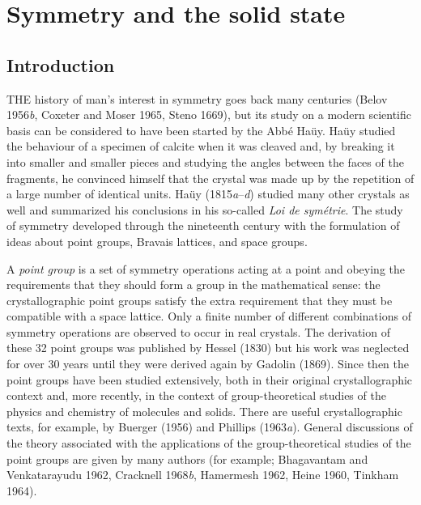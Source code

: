\documentclass[11pt,a4paper,twoside,openright]{book}
\begin{document}
\chapter{Symmetry and the solid state}

\section{Introduction}

THE history of man's interest in symmetry goes back many centuries (Belov 1956\textit{b}, Coxeter and Moser 1965, Steno 1669), but its study on a modern scientific basis can be considered to have been started by the Abbé Haüy. Haüy studied the behaviour of a specimen of calcite when it was cleaved and, by breaking it into smaller and smaller pieces and studying the angles between the faces of the fragments, he convinced himself that the crystal was made up by the repetition of a large number of identical units. Haüy (1815\textit{a}–\textit{d}) studied many other crystals as well and summarized his conclusions in his so-called \textit{Loi de symétrie}. The study of symmetry developed through the nineteenth century with the formulation of ideas about point groups, Bravais lattices, and space groups.

A \textit{point group} is a set of symmetry operations acting at a point and obeying the requirements that they should form a group in the mathematical sense: the crystallographic point groups satisfy the extra requirement that they must be compatible with a space lattice. Only a finite number of different combinations of symmetry operations are observed to occur in real crystals. The derivation of these 32 point groups was published by Hessel (1830) but his work was neglected for over 30 years until they were derived again by Gadolin (1869). Since then the point groups have been studied extensively, both in their original crystallographic context and, more recently, in the context of group-theoretical studies of the physics and chemistry of molecules and solids. There are useful crystallographic texts, for example, by Buerger (1956) and Phillips (1963\textit{a}). General discussions of the theory associated with the applications of the group-theoretical studies of the point groups are given by many authors (for example; Bhagavantam and Venkatarayudu 1962, Cracknell 1968\textit{b}, Hamermesh 1962, Heine 1960, Tinkham 1964).
\end{document}
